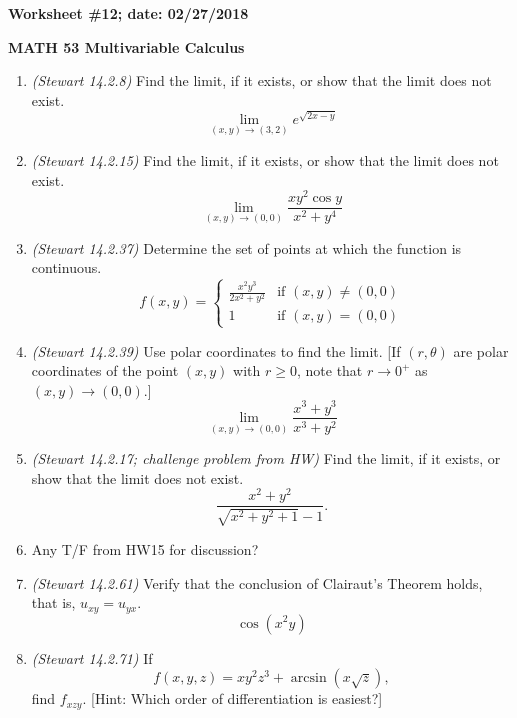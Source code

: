 \documentclass{article}
\begin{document}
{\bf Worksheet \#12; date: 02/27/2018}

{\bf MATH 53 Multivariable Calculus}

\begin{enumerate}
\item {\em (Stewart 14.2.8)} Find the limit, if it exists, or show that the limit does not exist.
\[
\lim_{(x, y) \to (3, 2)} e^{\sqrt{2x - y}}
\]

\item {\em (Stewart 14.2.15)} Find the limit, if it exists, or show that the limit does not exist.
\[
\lim_{(x, y) \to (0, 0)} \frac{xy^2 \cos y}{x^2 + y^4}
\]

\item {\em (Stewart 14.2.37)} Determine the set of points at which the function is continuous.
\[
f(x, y) = \begin{cases}
\frac{x^2 y^3}{2x^2 + y^2} & \text{if } (x, y) \ne (0, 0) \\
1 & \text{if } (x, y) = (0, 0)
\end{cases}
\]

\item {\em (Stewart 14.2.39)} Use polar coordinates to find the limit. [If $(r, \theta)$ are polar coordinates of the point $(x, y)$ with $r \ge 0$, note that $r \to 0^+$ as $(x, y) \to (0, 0)$.]
\[
\lim_{(x, y) \to (0, 0)} \frac{x^3 + y^3}{x^3 + y^2}
\]

\item {\em (Stewart 14.2.17; challenge problem from HW)} Find the limit, if it exists, or show that the limit does not exist.
\[
\frac{x^2 + y^2}{\sqrt{x^2 + y^2 + 1} - 1}.
\]

\item Any T/F from HW15 for discussion?

\item {\em (Stewart 14.2.61)} Verify that the conclusion of Clairaut's Theorem holds, that is, $u_{xy} = u_{yx}$.
\[
\cos(x^2 y)
\]

\item {\em (Stewart 14.2.71)} If
\[
f(x, y, z) = x y^2 z^3 + \arcsin(x \sqrt{z}),
\]
find $f_{xzy}$. [Hint: Which order of differentiation is easiest?]
\end{enumerate}
\end{document}
